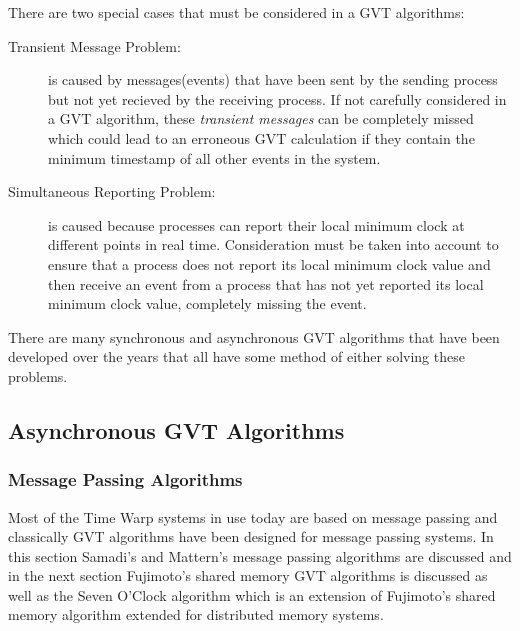 \documentclass[11pt]{book}
\begin{document}
There are two special cases that must be considered in a GVT algorithms:

\begin{description}
    \item[Transient Message Problem:] is caused by messages(events) that have been sent by
    the sending process but not yet recieved by the receiving process.  If not carefully
    considered in a GVT algorithm, these \emph{transient messages} can be completely missed
    which could lead to an erroneous GVT calculation if they contain the minimum timestamp
    of all other events in the system.
    \item[Simultaneous Reporting Problem:] is caused because processes can report their local
    minimum clock at different points in real time.  Consideration must be taken into account
    to ensure that a process does not report its local minimum clock value and then receive
    an event from a process that has not yet reported its local minimum clock value,
    completely missing the event.
\end{description}

\noindent
There are many synchronous and asynchronous GVT algorithms that have been developed over the
years that all have some method of either solving these problems.

\subsection{Asynchronous GVT Algorithms}

\subsubsection{Message Passing Algorithms}

Most of the Time Warp systems in use today are based on message passing and classically
GVT algorithms have been designed for message passing systems.  In this section Samadi's and
Mattern's message passing algorithms are discussed and in the next section Fujimoto's shared
memory GVT algorithms is discussed as well as the Seven O'Clock algorithm which is an
extension of Fujimoto's shared memory algorithm extended for distributed memory systems.
\end{document}
